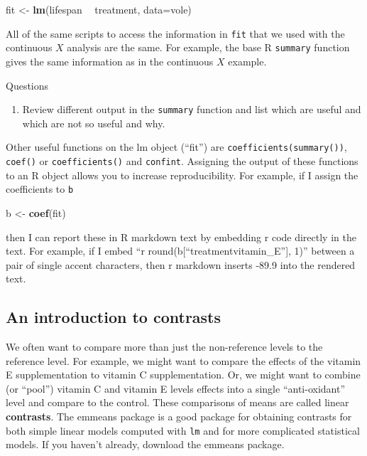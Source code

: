 \documentclass[]{book}
\newenvironment{Shaded}{\begin{snugshade}}{\end{snugshade}}
\newcommand{\KeywordTok}[1]{\textcolor[rgb]{0.13,0.29,0.53}{\textbf{#1}}}
\newcommand{\DataTypeTok}[1]{\textcolor[rgb]{0.13,0.29,0.53}{#1}}
\newcommand{\StringTok}[1]{\textcolor[rgb]{0.31,0.60,0.02}{#1}}
\newcommand{\OperatorTok}[1]{\textcolor[rgb]{0.81,0.36,0.00}{\textbf{#1}}}
\newcommand{\NormalTok}[1]{#1}
\providecommand{\tightlist}{%
  \setlength{\itemsep}{0pt}\setlength{\parskip}{0pt}}
\begin{document}
\begin{Shaded}
\begin{Highlighting}[]
\NormalTok{fit <-}\StringTok{ }\KeywordTok{lm}\NormalTok{(lifespan }\OperatorTok{~}\StringTok{ }\NormalTok{treatment, }\DataTypeTok{data=}\NormalTok{vole)}
\end{Highlighting}
\end{Shaded}

All of the same scripts to access the information in \texttt{fit} that
we used with the continuous \(X\) analysis are the same. For example,
the base R \texttt{summary} function gives the same information as in
the continuous \(X\) example.

Questions

\begin{enumerate}
\def\labelenumi{\arabic{enumi}.}
\setcounter{enumi}{3}
\tightlist
\item
  Review different output in the \texttt{summary} function and list
  which are useful and which are not so useful and why.
\end{enumerate}

Other useful functions on the lm object (``fit'') are
\texttt{coefficients(summary())}, \texttt{coef()} or
\texttt{coefficients()} and \texttt{confint}. Assigning the output of
these functions to an R object allows you to increase reproducibility.
For example, if I assign the coefficients to \texttt{b}

\begin{Shaded}
\begin{Highlighting}[]
\NormalTok{b <-}\StringTok{ }\KeywordTok{coef}\NormalTok{(fit)}
\end{Highlighting}
\end{Shaded}

then I can report these in R markdown text by embedding r code directly
in the text. For example, if I embed ``r
round(b{[}``treatmentvitamin\_E''{]}, 1)'' between a pair of single
accent characters, then r markdown inserts -89.9 into the rendered text.

\subsection{An introduction to
contrasts}\label{an-introduction-to-contrasts}

We often want to compare more than just the non-reference levels to the
reference level. For example, we might want to compare the effects of
the vitamin E supplementation to vitamin C supplementation. Or, we might
want to combine (or ``pool'') vitamin C and vitamin E levels effects
into a single ``anti-oxidant'' level and compare to the control. These
comparisons of means are called linear \textbf{contrasts}. The emmeans
package is a good package for obtaining contrasts for both simple linear
models computed with \texttt{lm} and for more complicated statistical
models. If you haven't already, download the emmeans package.
\end{document}
